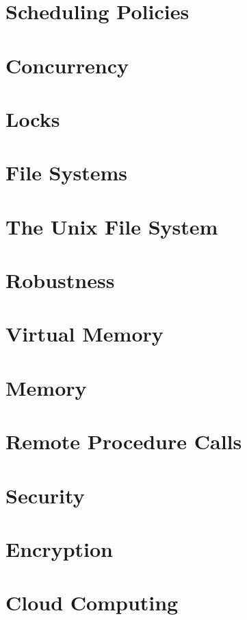 \documentclass[10pt]{article}
\begin{document}
\section{Scheduling Policies}


\section{Concurrency}


\section{Locks}


\section{File Systems}


\section{The Unix File System}


\section{Robustness}


\section{Virtual Memory}


\section{Memory}


\section{Remote Procedure Calls}


\section{Security}


\section{Encryption}


\section{Cloud Computing}

\end{document}
